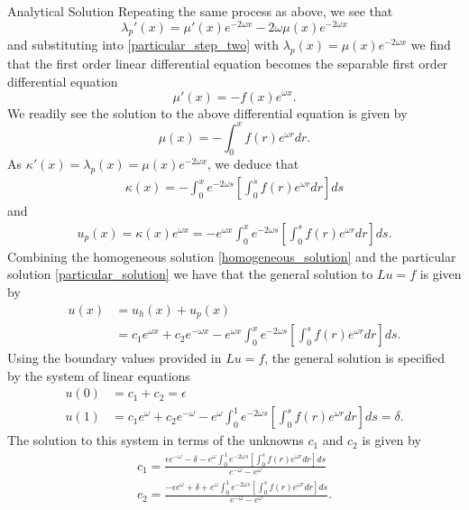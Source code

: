 \documentclass{article}
\begin{document}
\begin{section}{Analytical Solution}
  Repeating the same process as above, we see that
  \[
    \lambda_p'(x) = \mu'(x) e^{-2 \omega x} - 2 \omega\mu(x) e^{-2 \omega x}
  \]
  and substituting into \eqref{particular_step_two} with $\lambda_p(x) = \mu(x) e^{-2\omega x}$
  we find that the first order linear differential equation becomes the separable first order differential
  equation
  \[
    \mu'(x) = -f(x)e^{\omega x}.
  \]
  We readily see the solution to the above differential equation is given by
  \[
    \mu(x) = - \int_{0}^x f(r) e^{\omega r} dr.
  \]
  As $\kappa'(x) = \lambda_p(x) = \mu(x)e^{-2\omega x}$, we deduce that
  \begin{align*}
    \kappa(x) = - \int_{0}^{x} e^{-2 \omega s} \left[ \int_{0}^s f(r) e^{\omega r} dr \right] ds
  \end{align*}
  and
  \begin{align}\label{particular_solution}
    u_p(x) = \kappa(x)e^{\omega x} = -e^{\omega x} \int_{0}^{x} e^{-2 \omega s} \left[ \int_{0}^s f(r) e^{\omega r} dr \right] ds.
  \end{align}
  Combining the homogeneous solution \eqref{homogeneous_solution} and the particular
  solution \eqref{particular_solution} we have that the general solution to
  $Lu = f$ is given by
  \begin{align}\label{general_analytical_solution}
    u(x) &= u_h(x) + u_p(x) \nonumber \\
    &= c_1 e^{\omega x} + c_2 e^{-\omega x} - e^{\omega x} \int_{0}^{x} e^{-2 \omega s} \left[ \int_{0}^s f(r) e^{\omega r} dr \right] ds.
  \end{align}
  Using the boundary values provided in $Lu=f$, the general solution is specified
  by the system of linear equations
  \begin{align*}
    u(0) &= c_1 + c_2 = \epsilon \\
    u(1) &= c_1 e^{\omega} + c_2 e^{-\omega} - e^{\omega} \int_{0}^{1} e^{-2 \omega s} \left[ \int_{0}^s f(r) e^{\omega r} dr \right] ds = \delta .
  \end{align*}
  The solution to this system in terms of the unknowns $c_1$ and $c_2$ is given
  by
  \begin{align*}
    c_1 = \frac{\epsilon e^{-\omega} - \delta - e^{\omega} \int_{0}^{1} e^{-2 \omega s} \left[ \int_{0}^s f(r) e^{\omega r} dr \right] ds}{e^{-\omega} - e^{\omega}}\\
    c_2 = \frac{-\epsilon e^{\omega} + \delta + e^{\omega} \int_{0}^{1} e^{-2 \omega s} \left[ \int_{0}^s f(r) e^{\omega r} dr \right] ds}{e^{-\omega} - e^{\omega}}.
  \end{align*}


\end{section}
\end{document}
